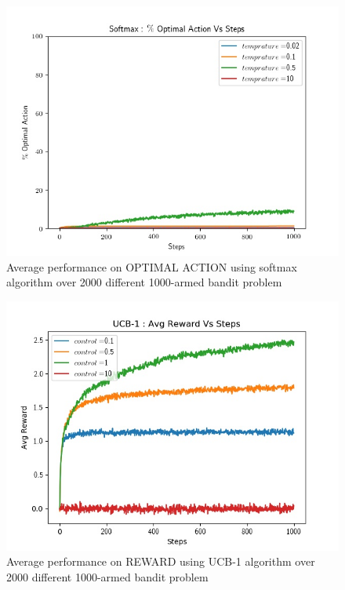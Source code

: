 \documentclass[preprint,12pt]{elsarticle}
\begin{document}
	 
	 \begin{figure}[H]
		 	\centering
		 	\includegraphics[scale=0.7]{./optimal_soft_1000.jpg}
		 	\hspace{0.25cm}
		 	\caption{Average performance on OPTIMAL ACTION using softmax algorithm over 2000 different 1000-armed bandit problem}
		 	\label{fig2:soft_opt_1000}
	 \end{figure}
		 
	
	\begin{figure}[H]
		\centering
		\includegraphics[scale=0.7]{./reward_ucb_1000.jpg}
		\hspace{0.25cm}
		\caption{Average performance on REWARD using UCB-1 algorithm over 2000 different 1000-armed bandit problem}
		\label{fig1:ucb_raw_1000}
	\end{figure}
	
\end{document}
